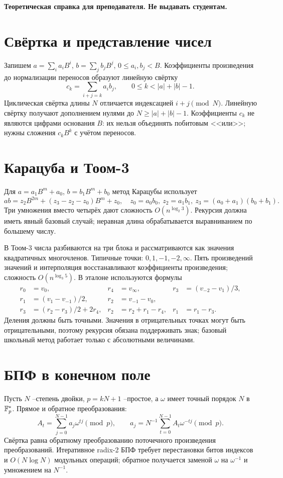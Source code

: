\documentclass[12pt]{ca-capstone}
\begin{document}
\begin{center}\textbf{Теоретическая справка для преподавателя. Не выдавать студентам.}\end{center}

\section{Свёртка и представление чисел}
Запишем $a=\sum_{i} a_{i}B^{i}$, $b=\sum_{j} b_{j}B^{j}$, $0\le a_{i},b_{j}<B$. Коэффициенты
произведения до нормализации переносов образуют линейную свёртку
\[
  c_{k}=\sum_{i+j=k}a_{i}b_{j},\qquad 0\le k<|a|+|b|-1.
\]
Циклическая свёртка длины $N$ отличается индексацией $i+j\pmod N$. Линейную свёртку получают
дополнением нулями до $N\ge |a|+|b|-1$. Коэффициенты $c_k$ не являются цифрами основания $B$:
их нельзя объединять побитовым <<или>>; нужны сложения $c_{k}B^{k}$ с учётом переносов.

\section{Карацуба и Тоом-3}
Для $a=a_1B^m+a_0$, $b=b_1B^m+b_0$ метод Карацубы использует
\[
 ab=z_2B^{2m}+(z_3-z_2-z_0)B^m+z_0,\quad
 z_0=a_0b_0,\ z_2=a_1b_1,\ z_3=(a_0+a_1)(b_0+b_1).
\]
Три умножения вместо четырёх дают сложность $O(n^{\log_2 3})$. Рекурсия должна иметь явный
базовый случай; неравная длина обрабатывается выравниванием по большему числу.

В Тоом-3 числа разбиваются на три блока и рассматриваются как значения квадратичных многочленов.
Типичные точки: $0,1,-1,-2,\infty$. Пять произведений значений и интерполяция восстанавливают
коэффициенты произведения; сложность $O(n^{\log_3 5})$. В эталоне используются формулы
\[
\begin{aligned}
r_0&=v_0,& r_4&=v_\infty,& r_3&=(v_{-2}-v_1)/3,\\
r_1&=(v_1-v_{-1})/2,& r_2&=v_{-1}-v_0,&&\\
r_3&=(r_2-r_3)/2+2r_4,&r_2&=r_2+r_1-r_4,&r_1&=r_1-r_3.
\end{aligned}
\]
Деления должны быть точными. Значения в отрицательных точках могут быть отрицательными, поэтому
рекурсия обязана поддерживать знак; базовый школьный метод работает только с абсолютными величинами.

\section{БПФ в конечном поле}
Пусть $N$ --степень двойки, $p=kN+1$ --простое, а $\omega$ имеет точный порядок $N$ в
$\mathbb{F}_{p}^*$. Прямое и обратное преобразования:
\[
 A_t=\sum_{j=0}^{N-1}a_j\omega^{tj}\pmod p,\qquad
 a_j=N^{-1}\sum_{t=0}^{N-1}A_t\omega^{-tj}\pmod p.
\]
Свёртка равна обратному преобразованию поточечного произведения преобразований. Итеративное
radix-2 БПФ требует перестановки битов индексов и $O(N\log N)$ модульных операций; обратное
получается заменой $\omega$ на $\omega^{-1}$ и умножением на $N^{-1}$.
\end{document}
